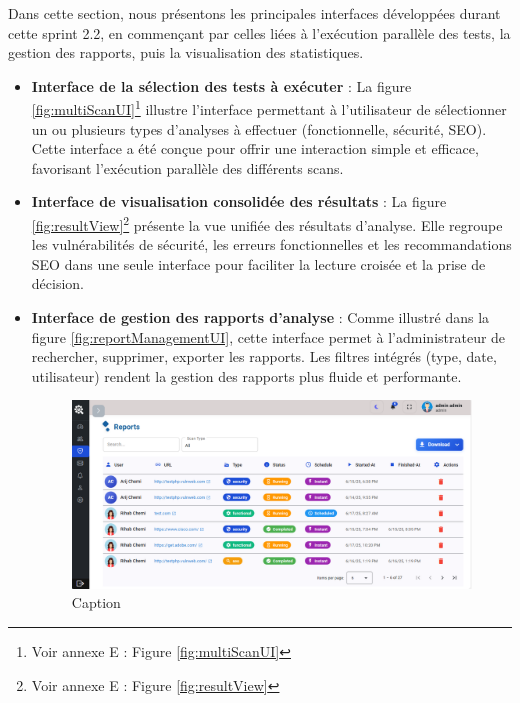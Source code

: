 \begin{justify}
Dans cette section, nous présentons les principales interfaces développées durant cette sprint 2.2, en commençant par celles liées à l'exécution parallèle des tests, la gestion des rapports, puis la visualisation des statistiques.
\end{justify}
\begin{itemize}[label=$\bullet$]
    \item \textbf{Interface de la sélection des tests à exécuter} :  
    La figure \ref{fig:multiScanUI}\footnote{Voir annexe E : Figure \ref{fig:multiScanUI}} illustre l’interface permettant à l’utilisateur de sélectionner un ou plusieurs types d’analyses à effectuer (fonctionnelle, sécurité, SEO). Cette interface a été conçue pour offrir une interaction simple et efficace, favorisant l’exécution parallèle des différents scans.

    \item \textbf{Interface de visualisation consolidée des résultats} :  
    La figure \ref{fig:resultView}\footnote{Voir annexe E : Figure \ref{fig:resultView}} présente la vue unifiée des résultats d’analyse. Elle regroupe les vulnérabilités de sécurité, les erreurs fonctionnelles et les recommandations SEO dans une seule interface pour faciliter la lecture croisée et la prise de décision.

    \item \textbf{Interface de gestion des rapports d’analyse} :  
    Comme illustré dans la figure \ref{fig:reportManagementUI}, cette interface permet à l’administrateur de rechercher, supprimer, exporter les rapports. Les filtres intégrés (type, date, utilisateur) rendent la gestion des rapports plus fluide et performante.
    \begin{figure}
        \centering
        \includegraphics[width=\linewidth]{chapitres/ch4Sp2/section/sprint2.2/img/interface/reports-admin-liste.PNG}
        \caption{Caption}
        \label{fig:enter-label}
    \end{figure}


\end{itemize}
